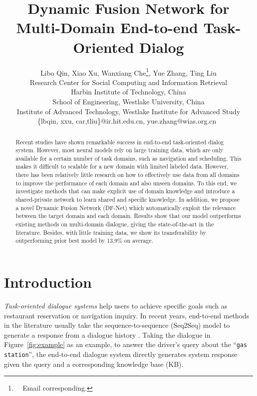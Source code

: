 \documentclass[11pt,a4paper]{article}
\title{
	Dynamic Fusion Network for Multi-Domain End-to-end Task-Oriented Dialog}
\author{Libo Qin, Xiao Xu, Wanxiang Che\thanks{\ \ Email corresponding.}, Yue Zhang, Ting Liu \\
	Research Center for Social Computing and Information Retrieval \\
	Harbin Institute of Technology, China \\
	School of Engineering, Westlake University, China \\
		Institute of Advanced Technology, Westlake Institute for Advanced Study \\
	 \{lbqin, xxu, car,tliu\}@ir.hit.edu.cn,
		yue.zhang@wias.org.cn\
}
\date{}
\begin{document}
\maketitle
\begin{abstract}
Recent studies have shown remarkable success in end-to-end task-oriented dialog system. 
However, most neural models rely on large training data, which are only available for a certain number of task domains, such as navigation and scheduling.
 This makes it difficult to scalable for a new domain with limited labeled data. 
However, there has been relatively little research on how to effectively use data from all domains to improve the performance of each domain and also unseen domains. 
To this end, we investigate methods that can make explicit use of domain knowledge and introduce a shared-private network to learn shared and specific knowledge. In addition, we propose a novel Dynamic Fusion Network (DF-Net) which automatically exploit the relevance between the target domain and each domain.
Results show that our model outperforms existing methods on multi-domain dialogue, giving the state-of-the-art in the literature. 
Besides, with little training data, we show its transferability by outperforming prior best model by 13.9\% on average.
\end{abstract}
\section{Introduction} \label{sec:intro}
\textit{Task-oriented dialogue systems} \cite{DBLP:journals/pieee/YoungGTW13} help users to achieve specific goals such as restaurant reservation or navigation inquiry.
In recent years, 
end-to-end methods
in the literature usually take the sequence-to-sequence (Seq2Seq) model to generate a response from a dialogue history \cite{eric-manning-2017-copy,eric-etal-2017-key,madotto-etal-2018-mem2seq,wen-etal-2018-sequence,gangi-reddy-etal-2019-multi,qin-etal-2019-entity,DBLP:conf/iclr/WuSX19}.
Taking the dialogue in Figure~\ref{fig:example} as an example, to answer the driver’s query about the ``\texttt{gas station}'', the end-to-end dialogue system directly generates system response given the query and a corresponding knowledge base (KB). 
\end{document}
